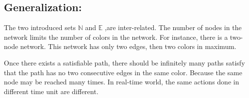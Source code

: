 \subsection*{Generalization:}
The two introduced sets $\mathbb{N}$ and $\mathbb{E}$ ,are inter-related. The number of nodes in the network limits the number of colors in the network. For instance, there is a two-node network. This network has only two edges, then two colors in maximum.

Once there exists a satisfiable path, there should be infinitely many paths satisfy that the path has no two consecutive edges in the same color. Because the same node may be reached many times. In real-time world, the same actions done in different time unit are different.



